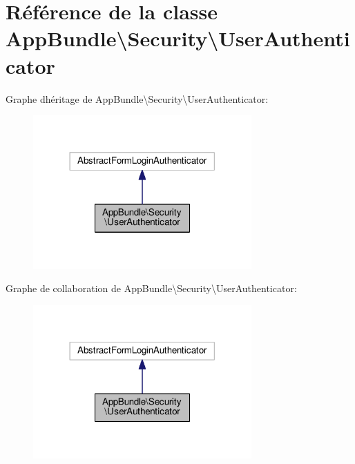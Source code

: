 \hypertarget{classAppBundle_1_1Security_1_1UserAuthenticator}{}\section{Référence de la classe App\+Bundle\textbackslash{}Security\textbackslash{}User\+Authenticator}
\label{classAppBundle_1_1Security_1_1UserAuthenticator}


Graphe d\textquotesingle{}héritage de App\+Bundle\textbackslash{}Security\textbackslash{}User\+Authenticator\+:\nopagebreak
\begin{figure}[H]
\begin{center}
\leavevmode
\includegraphics[width=237pt]{classAppBundle_1_1Security_1_1UserAuthenticator__inherit__graph}
\end{center}
\end{figure}


Graphe de collaboration de App\+Bundle\textbackslash{}Security\textbackslash{}User\+Authenticator\+:\nopagebreak
\begin{figure}[H]
\begin{center}
\leavevmode
\includegraphics[width=237pt]{classAppBundle_1_1Security_1_1UserAuthenticator__coll__graph}
\end{center}
\end{figure}
